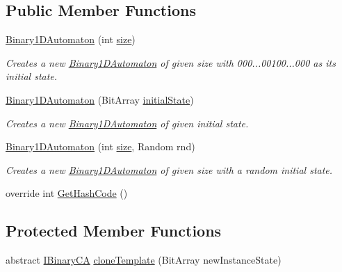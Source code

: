 \subsection*{Public Member Functions}
\begin{DoxyCompactItemize}
\item 
\hyperlink{class_cellular_1_1_binary1_d_automaton_a430f4985d036b8e48bfc785fe57b2bd1}{Binary1\+D\+Automaton} (int \hyperlink{class_cellular_1_1_automaton1_d_a915129ccf0f1e7092844c99ce6a28e5b}{size})
\begin{DoxyCompactList}\small\item\em Creates a new {\ttfamily \hyperlink{class_cellular_1_1_binary1_d_automaton}{Binary1\+D\+Automaton}} of given size with 000...00100...000 as its initial state. \end{DoxyCompactList}\item 
\hyperlink{class_cellular_1_1_binary1_d_automaton_a5c20fa6b3f7ffdd92187d216929099d4}{Binary1\+D\+Automaton} (Bit\+Array \hyperlink{all__1_8js_ae8b87ff4be2ae1dd5267342795263360}{initial\+State})
\begin{DoxyCompactList}\small\item\em Creates a new {\ttfamily \hyperlink{class_cellular_1_1_binary1_d_automaton}{Binary1\+D\+Automaton}} of given initial state. \end{DoxyCompactList}\item 
\hyperlink{class_cellular_1_1_binary1_d_automaton_af4e1fb39b1b0dad8c3ab648c7ba0ba8c}{Binary1\+D\+Automaton} (int \hyperlink{class_cellular_1_1_automaton1_d_a915129ccf0f1e7092844c99ce6a28e5b}{size}, Random rnd)
\begin{DoxyCompactList}\small\item\em Creates a new {\ttfamily \hyperlink{class_cellular_1_1_binary1_d_automaton}{Binary1\+D\+Automaton}} of given size with a random initial state. \end{DoxyCompactList}\item 
override int \hyperlink{class_cellular_1_1_binary1_d_automaton_add2d1cf0d8d25af3ac4af819be2561b9}{Get\+Hash\+Code} ()
\end{DoxyCompactItemize}
\subsection*{Protected Member Functions}
\begin{DoxyCompactItemize}
\item 
abstract \hyperlink{interface_cellular_1_1_i_binary_c_a}{I\+Binary\+C\+A} \hyperlink{class_cellular_1_1_binary1_d_automaton_a38ac5ae077c5d31356d278247fbab40a}{clone\+Template} (Bit\+Array new\+Instance\+State)
\end{DoxyCompactItemize}
